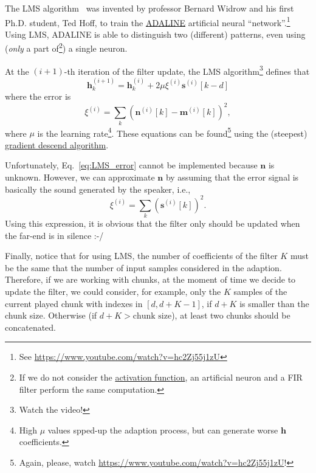 The LMS algorithm~\cite{haykin1995adaptive,boyd2004convex} was
invented by professor Bernard Widrow and his first Ph.D. student, Ted
Hoff, to train the
\href{https://en.wikipedia.org/wiki/ADALINE}{ADALINE} artificial
neural ``network''.\footnote{See
  \url{https://www.youtube.com/watch?v=hc2Zj55j1zU}} Using LMS,
ADALINE is able to distinguish two (different) patterns, even using
(\emph{only} a part of\footnote{If we do not consider the
  \href{https://en.wikipedia.org/wiki/Activation_function}{activation
    function}, an artificial neuron and a FIR filter perform the same
  computation.}) a single neuron.

At the $(i+1)$-th iteration of the filter update, the LMS
algorithm\footnote{Watch the video!} defines that
\begin{equation}
  \mathbf{h}^{(i+1)}_k = \mathbf{h}^{(i)}_k + 2\mu\xi^{(i)}\mathbf{s}^{(i)}[k-d] \label{eq:update}
\end{equation}
where the error is
\begin{equation}
  \xi^{(i)} = \sum_k(\mathbf{n}^{(i)}[k] - \mathbf{m}^{(i)}[k])^2, \label{eq:LMS_error}
\end{equation}
where $\mu$ is the learning
rate\footnote{High $\mu$ values spped-up the adaption process, but can
generate worse $\mathbf{h}$ coefficients.}.  These equations can be
found\footnote{Again, please, watch
\url{https://www.youtube.com/watch?v=hc2Zj55j1zU}!} using the
(steepest)
\href{https://en.wikipedia.org/wiki/Gradient_descent}{gradient descend
  algorithm}.

Unfortunately, Eq.~\eqref{eq:LMS_error} cannot be implemented because $\mathbf{n}$ is unknown. However, we can
approximate $\mathbf{n}$ by assuming that the error signal is basically the
sound generated by the speaker, i.e.,
\begin{equation}
  \xi^{(i)} = \sum_k(\mathbf{s}^{(i)}[k])^2. \label{eq:the_error_is_the_speaker}
\end{equation}
Using this expression, it is obvious that the filter only should be
updated when the far-end is in silence :-/

Finally, notice that for using LMS, the number of coefficients of the
filter $K$ must be the same that the number of input samples
considered in the adaption. Therefore, if we are working with chunks,
at the moment of time we decide to update the filter, we could
consider, for example, only the $K$ samples of the current played
chunk with indexes in $[d, d+K-1]$, if $d+K$ is smaller than the
chunk size. Otherwise (if $d+K > \text{chunk~size}$), at least two
chunks should be concatenated.

